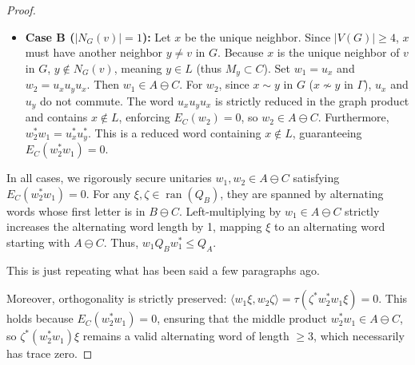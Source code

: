 \documentclass[12pt]{article}
\newcommand{\review}[1]{\begin{reviewbox}#1\end{reviewbox}}
\begin{document}
\begin{proof}
\begin{itemize}
  If $x \sim y$ in $G$ ($x \nsim y$ in $\Gamma$): Set $w_1 = u_x$ and $w_2 = u_x u_y u_x$. Because $x \notin L$, $E_C(w_1) = 0$, so $w_1 \in A \ominus C$. In the graph product, any reduced word containing at least one letter outside $L$ is strictly orthogonal to $M_L$. Since $x \nsim y$ in $\Gamma$, $u_x$ and $u_y$ do not commute, meaning $u_x u_y u_x$ is a reduced word. Because it contains $x \notin L$, its conditional expectation onto $C$ is exactly $E_C(w_2) = 0$, so $w_2 \in A \ominus C$. Further, $w_2^* w_1 = u_x^* u_y^* u_x^* u_x = u_x^* u_y^*$. This is a reduced word with letters outside $L$, guaranteeing $E_C(w_2^* w_1) = 0$.
  
  If $x \nsim y$ in $G$ ($x \sim y$ in $\Gamma$): Set $w_1 = u_x$ and $w_2 = u_y$. Both are strictly in $A \ominus C$. Since they commute, $w_2^* w_1 = u_y^* u_x$. Because $x \neq y$ and both $\notin L$, this is a product of mutually commuting elements strictly outside $L$, guaranteeing $E_C(w_2^* w_1) = E_C(u_y^*)E_C(u_x) = 0$.

  \review{It's not clear to me why the AI decided to split into two cases here. The argument in the second case would have worked for both cases.}
  
    \item \textbf{Case B ($|N_G(v)| = 1$):} Let $x$ be the unique neighbor. Since $|V(G)| \ge 4$, $x$ must have another neighbor $y \neq v$ in $G$. Because $x$ is the unique neighbor of $v$ in $G$, $y \notin N_G(v)$, meaning $y \in L$ (thus $M_y \subset C$). Set $w_1 = u_x$ and $w_2 = u_x u_y u_x$. Then $w_1 \in A \ominus C$. For $w_2$, since $x \sim y$ in $G$ ($x \nsim y$ in $\Gamma$), $u_x$ and $u_y$ do not commute. The word $u_x u_y u_x$ is strictly reduced in the graph product and contains $x \notin L$, enforcing $E_C(w_2) = 0$, so $w_2 \in A \ominus C$. Furthermore, $w_2^* w_1 = u_x^* u_y^*$. This is a reduced word containing $x \notin L$, guaranteeing $E_C(w_2^* w_1) = 0$.
\end{itemize}

In all cases, we rigorously secure unitaries $w_1, w_2 \in A \ominus C$ satisfying $E_C(w_2^* w_1) = 0$. 
For any $\xi, \zeta \in \operatorname{ran}(Q_B)$, they are spanned by alternating words whose first letter is in $B \ominus C$. Left-multiplying by $w_1 \in A \ominus C$ strictly increases the alternating word length by 1, mapping $\xi$ to an alternating word starting with $A \ominus C$. Thus, $w_1 Q_B w_1^* \le Q_A$. \review{This is just repeating what has been said a few paragraphs ago.} Moreover, orthogonality is strictly preserved: $\langle w_1 \xi, w_2 \zeta \rangle = \tau(\zeta^* w_2^* w_1 \xi) = 0$. This holds because $E_C(w_2^* w_1) = 0$, ensuring that the middle product $w_2^* w_1 \in A \ominus C$, so $\zeta^* (w_2^* w_1) \xi$ remains a valid alternating word of length $\ge 3$, which necessarily has trace zero.


\end{proof}
\end{document}
